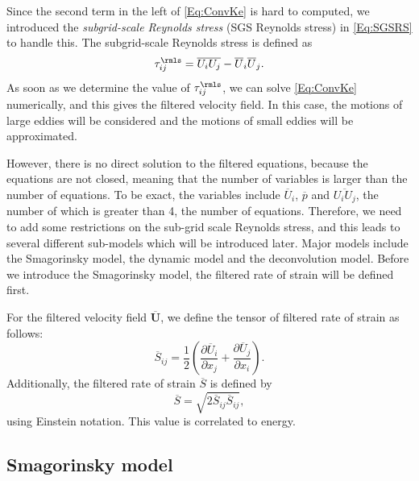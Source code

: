 \documentclass[english, nochinese]{pkupaper}
\begin{document}
Since the second term in the left of \eqref{Eq:ConvKe} is hard to computed, we introduced the \emph{subgrid-scale Reynolds stress} (SGS Reynolds stress) in \eqref{Eq:SGSRS} to handle this. The subgrid-scale Reynolds stress is defined as
\begin{equation}\label{Eq:SGSRS}
\tau_{ij}^{\rmls} = \overline{U_iU_j} - \overline{U}_i\overline{U}_j.
\end{equation}
As soon as we determine the value of $\tau_{ij}^{\rmls}$, we can solve \eqref{Eq:ConvKe} numerically, and this gives the filtered velocity field. In this case, the motions of large eddies will be considered and the motions of small eddies will be approximated.

However, there is no direct solution to the filtered equations, because the equations are not closed, meaning that the number of variables is larger than the number of equations. To be exact, the variables include $\overline{U}_i$, $\overline{p}$ and $\overline{U_iU_j}$, the number of which is greater than 4, the number of equations. Therefore, we need to add some restrictions on the sub-grid scale Reynolds stress, and this leads to several different sub-models which will be introduced later. Major models include the Smagorinsky model, the dynamic model and the deconvolution model. Before we introduce the Smagorinsky model, the filtered rate of strain will be defined first.

For the filtered velocity field $\overline{\mathbf{U}}$, we define the tensor of filtered rate of strain as follows:
\begin{equation}
\overline{S}_{ij} = \frac{1}{2}\left(\frac{\partial\overline{U}_i}{\partial x_j} + \frac{\partial\overline{U}_j}{\partial x_i}\right).
\end{equation}
Additionally, the filtered rate of strain $\overline{S}$ is defined by
\begin{equation}
\overline{S} = \sqrt{2\overline{S}_{ij}\overline{S}_{ij}},
\end{equation}
using Einstein notation. This value is correlated to energy.

\subsection{Smagorinsky model}
\end{document}
